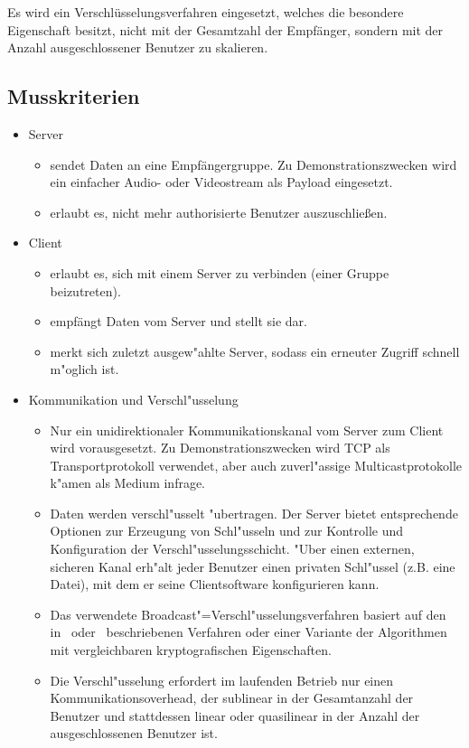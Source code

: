 \documentclass[a4paper,10pt]{scrartcl}
\begin{document}
Es wird ein Verschlüsselungsverfahren eingesetzt, welches die besondere
Eigenschaft besitzt, nicht mit der Gesamtzahl der Empfänger, sondern mit der Anzahl
ausgeschlossener Benutzer zu skalieren.

\subsection{Musskriterien}

\begin{itemize}

\item Server
\begin{itemize}
   \item sendet Daten an eine Empfängergruppe. Zu Demonstrationszwecken wird
         ein einfacher Audio- oder Videostream als Payload eingesetzt.
   \item erlaubt es, nicht mehr authorisierte Benutzer auszuschließen.
\end{itemize}

\item Client
\begin{itemize}
   \item erlaubt es, sich mit einem Server zu verbinden (einer Gruppe beizutreten).
   \item empfängt Daten vom Server und stellt sie dar.
   \item merkt sich zuletzt ausgew"ahlte Server, sodass ein erneuter Zugriff schnell
         m"oglich ist.
\end{itemize}

\item Kommunikation und Verschl"usselung
\begin{itemize}
   \item Nur ein unidirektionaler Kommunikationskanal vom Server zum Client wird
         vorausgesetzt. Zu Demonstrationszwecken wird TCP als Transportprotokoll
         verwendet, aber auch zuverl"assige Multicastprotokolle k"amen als Medium
         infrage.
   \item Daten werden verschl"usselt "ubertragen. Der Server bietet entsprechende
         Optionen zur Erzeugung von Schl"usseln und zur Kontrolle und Konfiguration
         der Verschl"usselungsschicht. "Uber einen externen, sicheren Kanal erh"alt
         jeder Benutzer einen privaten Schl"ussel (z.B. eine Datei), mit dem er seine
         Clientsoftware konfigurieren kann.
   \item Das verwendete Broadcast"=Verschl"usselungsverfahren basiert auf den
         in~\cite[Section~2.2]{Naor00} oder~\cite{Garg10} beschriebenen Verfahren
         oder einer Variante der Algorithmen mit vergleichbaren kryptografischen
         Eigenschaften.
   \item Die Verschl"usselung erfordert im laufenden Betrieb nur einen
         Kommunikationsoverhead, der sublinear in der Gesamtanzahl der Benutzer und
         stattdessen linear oder quasilinear in der Anzahl der ausgeschlossenen
         Benutzer ist.
\end{itemize}
\end{itemize}
\newpage
\end{document}
